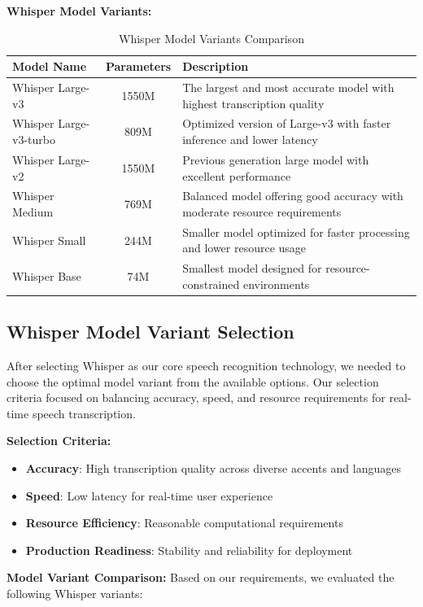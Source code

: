 \documentclass[12pt,a4paper]{article}
\begin{document}
\textbf{Whisper Model Variants:}
\begin{table}[H]
\centering
\begin{tabular}{|l|c|p{}|}
\hline
\textbf{Model Name} & \textbf{Parameters} & \textbf{Description} \\
\hline
Whisper Large-v3 & 1550M & The largest and most accurate model with highest transcription quality \\
\hline
Whisper Large-v3-turbo & 809M & Optimized version of Large-v3 with faster inference and lower latency \\
\hline
Whisper Large-v2 & 1550M & Previous generation large model with excellent performance \\
\hline
Whisper Medium & 769M & Balanced model offering good accuracy with moderate resource requirements \\
\hline
Whisper Small & 244M & Smaller model optimized for faster processing and lower resource usage \\
\hline
Whisper Base & 74M & Smallest model designed for resource-constrained environments \\
\hline
\end{tabular}
\caption{Whisper Model Variants Comparison}
\end{table}

\subsection{Whisper Model Variant Selection}

After selecting Whisper as our core speech recognition technology, we needed to choose the optimal model variant from the available options. Our selection criteria focused on balancing accuracy, speed, and resource requirements for real-time speech transcription.

\textbf{Selection Criteria:}
\begin{itemize}
    \item \textbf{Accuracy}: High transcription quality across diverse accents and languages
    \item \textbf{Speed}: Low latency for real-time user experience
    \item \textbf{Resource Efficiency}: Reasonable computational requirements
    \item \textbf{Production Readiness}: Stability and reliability for deployment
\end{itemize}

\textbf{Model Variant Comparison:}
Based on our requirements, we evaluated the following Whisper variants:
\end{document}
